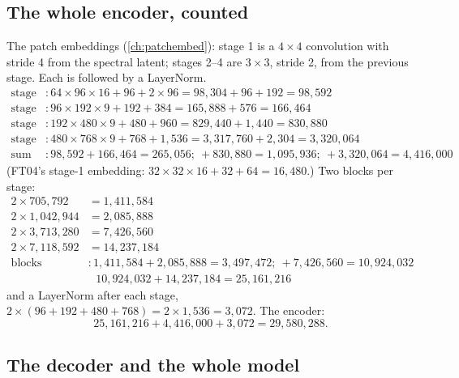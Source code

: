 \subsection{The whole encoder, counted}

The patch embeddings (\cref{ch:patchembed}): stage 1 is a $4\times4$ convolution with stride 4 from the spectral
latent; stages 2--4 are $3\times3$, stride 2, from the previous stage. Each is followed by a LayerNorm.
\begin{align*}
\text{stage 1} &: 64\times96\times16 + 96 + 2\times96 = 98{,}304 + 96 + 192 = 98{,}592\\
\text{stage 2} &: 96\times192\times9 + 192 + 384 = 165{,}888 + 576 = 166{,}464\\
\text{stage 3} &: 192\times480\times9 + 480 + 960 = 829{,}440 + 1{,}440 = 830{,}880\\
\text{stage 4} &: 480\times768\times9 + 768 + 1{,}536 = 3{,}317{,}760 + 2{,}304 = 3{,}320{,}064\\
\text{sum} &: 98{,}592+166{,}464 = 265{,}056;\ +830{,}880 = 1{,}095{,}936;\ +3{,}320{,}064 = 4{,}416{,}000
\end{align*}
(FT04's stage-1 embedding: $32\times32\times16+32+64=16{,}480$.) Two blocks per stage:
\begin{align*}
2\times705{,}792 &= 1{,}411{,}584\\
2\times1{,}042{,}944 &= 2{,}085{,}888\\
2\times3{,}713{,}280 &= 7{,}426{,}560\\
2\times7{,}118{,}592 &= 14{,}237{,}184\\
\text{blocks} &: 1{,}411{,}584+2{,}085{,}888 = 3{,}497{,}472;\ +7{,}426{,}560 = 10{,}924{,}032\\
&\phantom{:}\ 10{,}924{,}032+14{,}237{,}184 = 25{,}161{,}216
\end{align*}
and a LayerNorm after each stage, $2\times(96+192+480+768)=2\times1{,}536=3{,}072$. The encoder:
\[
25{,}161{,}216 + 4{,}416{,}000 + 3{,}072 = 29{,}580{,}288 .
\]

\subsection{The decoder and the whole model}

